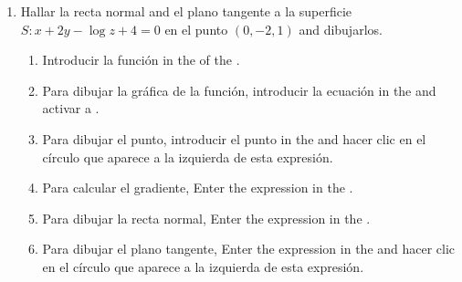 \begin{enumerate}[leftmargin=*]
\item Hallar la recta normal and el plano tangente a la superficie $S: x+2y-\log z +4 =0$ en el punto $(0,-2,1)$ and dibujarlos.
      \begin{indication}
      \begin{enumerate}
      \item Introducir la función  in the  of the  .
      \item Para dibujar la gráfica de la función, introducir la ecuación  in the  and activar a .
      \item Para dibujar el punto, introducir el punto  in the  and hacer clic en el círculo que aparece a la izquierda de esta expresión.
      \item Para calcular el gradiente, Enter the expression  in the .
      \item Para dibujar la recta normal, Enter the expression  in the .
      \item Para dibujar el plano tangente, Enter the expression  in the  and hacer clic en el círculo que aparece a la izquierda de esta expresión.
      \end{enumerate}
      \end{indication}


\end{enumerate}
